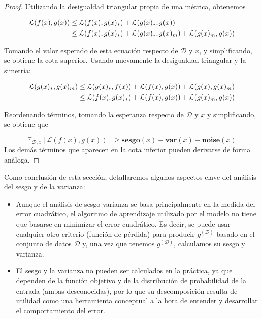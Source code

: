 \begin{proof}
    Utilizando la desigualdad triangular propia de una métrica, obtenemos

    \begin{align}
        \mathcal{L}(f(x), g(x)) 
        &\leq \mathcal{L}(f(x), g(x)_*) + \mathcal{L}(g(x)_*, g(x)) \notag \\
        &\leq \mathcal{L}(f(x), g(x)_*) + \mathcal{L}(g(x)_*, g(x)_m) + \mathcal{L}(g(x)_m, g(x))
    \end{align}
    

    Tomando el valor esperado de esta ecuación respecto de $\mathcal{D}$ y $x$, y simplificando, se obtiene la cota superior. Usando nuevamente la desigualdad triangular y la simetría:

    \begin{align}
        \mathcal{L}(g(x)_*, g(x)_m) 
        &\leq \mathcal{L}(g(x)_*, f(x)) + \mathcal{L}(f(x), g(x)) + \mathcal{L}(g(x), g(x)_m) \notag \\
        &\leq \mathcal{L}(f(x), g(x)_*) + \mathcal{L}(f(x), g(x)) + \mathcal{L}(g(x)_m, g(x))
    \end{align}

    Reordenando términos, tomando la esperanza respecto de $\mathcal{D}$ y $x$ y simplificando, se obtiene que 

    \[
        \mathbb{E}_{\mathcal{D}, x}[\mathcal{L}(f(x), g(x))] \geq \textbf{sesgo}(x) - \textbf{var}(x) - \textbf{noise}(x)
    \]
    Los demás términos que aparecen en la cota inferior pueden derivarse de forma análoga.\newline
\end{proof}


Como conclusión de esta sección, detallaremos algunos aspectos clave del análisis del sesgo y de la varianza:

\begin{itemize}
    \item Aunque el análisis de sesgo-varianza se basa principalmente en la medida del error cuadrático, el algoritmo de aprendizaje utilizado por el modelo no tiene que basarse en minimizar el error cuadrático. Es decir, se puede usar cualquier otro criterio (función de pérdida) para producir $g^{\mathcal{(D)}}$ basado en el conjunto de datos $\mathcal{D}$ y, una vez que tenemos $g^{\mathcal{(D)}}$, calculamos su sesgo y varianza.
    \item El sesgo y la varianza no pueden ser calculados en la práctica, ya que dependen de la función objetivo y de la distribución de probabilidad de la entrada (ambas desconocidas), por lo que su descomposición resulta de utilidad como una herramienta conceptual a la hora de entender y desarrollar el comportamiento del error.\newline
    
\end{itemize}

